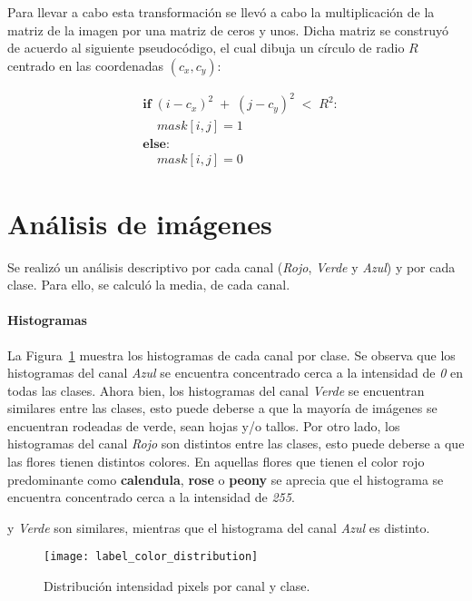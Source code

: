 \documentclass{article}
\begin{document}
Para llevar a cabo esta transformación se llevó a cabo la multiplicación de la matriz de la imagen por una matriz de ceros y unos. Dicha matriz se construyó de acuerdo al siguiente pseudocódigo, el cual dibuja un círculo de radio $R$ centrado en las coordenadas $(c_x, c_y)$:

{
\small
\begin{align*}
  &\mathbf{if} \;  (i-c_x)^2\; + \; (j-c_y)^2 \; < \; R^2 : \\
  & \;\;\;\; mask[i,j]  = 1 \\
  &\mathbf{else}: \\
  & \;\;\;\;mask[i,j] = 0
\end{align*}
}

\section{Análisis de imágenes}

Se realizó un análisis descriptivo por cada canal (\textit{Rojo}, \textit{Verde} y \textit{Azul}) y por cada clase. Para ello, se calculó la media, de cada canal.

\paragraph{Histogramas}

La Figura~\ref{fig:label_color_distribution} muestra los histogramas de cada canal por clase. Se observa que los histogramas del canal \textit{Azul} se encuentra concentrado cerca a la intensidad de \textit{0} en todas las clases. Ahora bien, los histogramas del canal \textit{Verde} se encuentran similares entre las clases, esto puede deberse a que la mayoría de imágenes se encuentran rodeadas de verde, sean hojas y/o tallos. Por otro lado, los histogramas del canal \textit{Rojo} son distintos entre las clases, esto puede deberse a que las flores tienen distintos colores. En aquellas flores que tienen el color rojo predominante como \textbf{calendula}, \textbf{rose} o \textbf{peony} se aprecia que el histograma se encuentra concentrado cerca a la intensidad de \textit{255}.

y \textit{Verde} son similares, mientras que el histograma del canal \textit{Azul} es distinto.

\begin{figure}[H]
  \centering
  \texttt{[image: label\_color\_distribution]}
  \caption{Distribución intensidad pixels por canal y clase.}
  \label{fig:label_color_distribution}
\end{figure}
\end{document}
